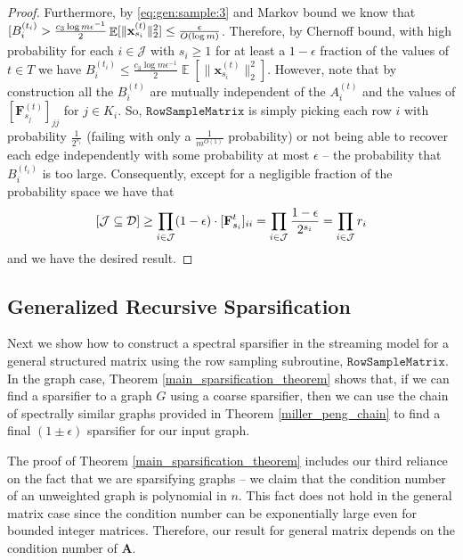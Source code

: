 \documentclass[11pt]{article}
\DeclareMathOperator*{\E}{\mathbb{E}}
\let\Pr\relax
\DeclareMathOperator*{\Pr}{\mathbb{P}}
\newcommand{\norm}[1]{\|#1\|}
\newcommand{\bv}[1]{\mathbf{#1}}
\newcommand{\sample}{\texttt{RowSampleMatrix}}
\newcommand{\mvar}[1]{\bv{#1}}
\newcommand{\ma}{\mvar{A}}
\newcommand{\mf}{\mvar{F}}
\newcommand{\dist}{\mathcal{D}}
\begin{document}
\begin{proof}
Furthermore, by \eqref{eq:gen:sample:3} and Markov bound we know that $\Pr[B_i^{(t_i)} > \frac{c_3 \log m \epsilon^{-1}}{2}\E[\norm{\bv{x}_{s_i}^{(t)}}_2^2] \leq \frac{\epsilon}{O(\log m)}$. Therefore, by Chernoff bound, with high probability for each $i \in \mathcal{J}$ with $s_i \geq 1$ for at least a $1 - \epsilon$ fraction of the values of $t \in T$ we have $B_i^{(t_i)} \leq \frac{c_3 \log m \epsilon^{-1}}{2}\E[\norm{\bv{x}_{s_i}^{(t)}}_2^2]$. However, note that by construction all the $B_i^{(t)}$ are mutually independent of the $A_i^{(t)}$ and the values of $[\bv{F}_{s_j}^{(t)}]_{jj}$ for $j \in K_i$. So, $\sample$ is simply picking each row $i$ with probability $\frac{1}{2^{s_i}}$ (failing with only a $\frac{1}{m^{O(1)}}$ probability) or not being able to recover each edge independently with some probability at most $\epsilon$ -- the probability that $B_i^{(t_i)}$ is too large. Consequently,  except for a negligible fraction of the probability space we have that
\[
\Pr\left[\mathcal{J} \subseteq \dist\right]
\geq \prod_{i \in \mathcal{J}} (1 - \epsilon) \cdot [\mf_{s_i}^{t}]_{ii}
= \prod_{i \in \mathcal{J}} \frac{1 -\epsilon}{2^{s_i}}
= \prod_{i \in \mathcal{J}} r_i
\]
and we have the desired result.
\end{proof}

\subsection{Generalized Recursive Sparsification}
\label{sec:sub:gen:sparse}

Next we show how to construct a spectral sparsifier in the streaming model for a general
structured matrix using the row sampling subroutine, $\sample$.
In the graph case, Theorem \ref{main_sparsification_theorem} shows
that, if we can find a sparsifier to a graph $G$ using a coarse sparsifier,
then we can use the chain of spectrally similar graphs provided
in Theorem \ref{miller_peng_chain} to find a final $(1 \pm \epsilon)$ sparsifier for our input graph.

The proof of Theorem \ref{main_sparsification_theorem} includes our third reliance on the fact that we are sparsifying graphs -- we claim that the condition number of an unweighted
graph is polynomial in $n$. This fact does not hold in the general matrix case since the condition number can be exponentially large even for bounded integer matrices. Therefore,
our result for general matrix depends on the condition number of $\ma$. 
\end{document}
